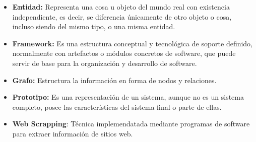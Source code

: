 \begin{itemize}
  \item \textbf{Entidad:} Representa una cosa u objeto del mundo real con existencia independiente, es decir, se diferencia únicamente de otro objeto o cosa, incluso siendo del mismo tipo, o una misma entidad.
  \item \textbf{Framework: }Es una estructura conceptual y tecnológica de soporte definido, normalmente con artefactos o módulos concretos de software, que puede servir de base para la organización y desarrollo de software. 
   \item \textbf{Grafo:} Estructura la información en forma de nodos y relaciones.
   \item \textbf{Prototipo:} Es una representación de un sistema, aunque no es un sistema completo, posee las características del sistema final o parte de ellas.
   \item \textbf{Web Scrapping}:  Técnica implemendatada mediante programas de software para extraer información de sitios web.
\end{itemize}
